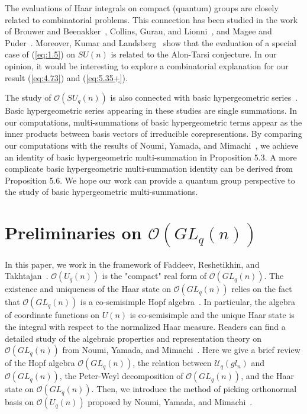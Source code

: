 \documentclass[table,a4paper,reqno]{amsart}
\numberwithin{equation}{section}
\theoremstyle{definition}
\begin{document}
The evaluations of Haar integrals on compact (quantum) groups are closely related to combinatorial problems. This connection has been studied in the work of Brouwer and Beenakker~\cite{brouwer1996diagrammatic}, Collins, Gurau, and Lionni~\cite{collins2023tensor}, and Magee and Puder~\cite{magee2019matrix}. Moreover, Kumar and Landsberg~\cite{kumar2015connections} show that the evaluation of a special case of (\ref{eq:1.5}) on $SU(n)$ is related to the Alon-Tarsi conjecture. In our opinion, it would be interesting to explore a combinatorial explanation for our result (\ref{eq:4.73}) and (\ref{eq:5.35+}).

The study of $\mathcal{O}(SU_q(n))$ is also connected with basic hypergeometric series~\cite{masuda1991representations,koelink1989clebsch,vaksman1990algebra,bergeron2019suq}. Basic hypergeometric series appearing in these studies are single summations. In our computations, multi-summations of basic hypergeometric terms appear as the inner products between basis vectors of irreducible corepresentions. By comparing our computations with the results of Noumi, Yamada, and Mimachi~\cite{noumi1993finite}, we achieve an identity of basic hypergeometric multi-summation in Proposition 5.3. A more complicate basic hypergeometric multi-summation identity can be derived from Proposition 5.6. We hope our work can provide a quantum group perspective to the study of basic hypergeometric multi-summations.

\section{Preliminaries on $\mathcal{O}(GL_q(n))$}
In this paper, we work in the framework of Faddeev, Reshetikhin, and Takhtajan~\cite{faddeev1988quantization,dijkhuizen1994cqg}. $\mathcal{O}(U_q(n))$ is the "compact" real form of $\mathcal{O}(GL_q(n))$. The existence and uniqueness of the Haar state on $\mathcal{O}(GL_q(n))$ relies on the fact that $\mathcal{O}(GL_q(n))$ is a co-semisimple Hopf algebra~\cite{sweedler1969hopf}. In particular, the algebra of coordinate functions on $U(n)$ is co-semisimple and the unique Haar state is the integral with respect to the normalized Haar measure. Readers can find a detailed study of the algebraic properties and representation theory on $\mathcal{O}(GL_q(n))$ from Noumi, Yamada, and Mimachi~\cite{noumi1993finite}. Here we give a brief review of the Hopf algebra $\mathcal{O}(GL_q(n))$, the relation between $\mathcal{U}_q(gl_n)$ and $\mathcal{O}(GL_q(n))$, the Peter-Weyl decomposition of $\mathcal{O}(GL_q(n))$, and the Haar state on $\mathcal{O}(GL_q(n))$. Then, we introduce the method of picking orthonormal basis on $\mathcal{O}(U_q(n))$ proposed by Noumi, Yamada, and Mimachi~\cite{noumi1993finite}.
\end{document}
